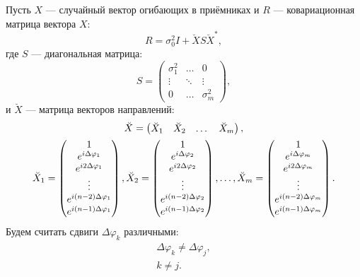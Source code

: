 Пусть $X$ --- случайный вектор огибающих в приёмниках и $R$ --- ковариационная матрица вектора $X$:
\[
    R = \sigma_0^2 I + \breve{X} S \breve{X}^* ,
\]
где $S$ --- диагональная матрица:
\[
    S
    = \begin{pmatrix}
        \sigma_1^2 & \dots  & 0          \\
        \vdots     & \ddots & \vdots     \\
        0          & \dots  & \sigma_m^2
    \end{pmatrix} ,
\]
и $\breve{X}$ --- матрица векторов направлений:
\begin{gather*}
    \breve{X}
    = \begin{pmatrix}
        \breve{X}_1 & \breve{X}_2 & \dots & \breve{X}_m
    \end{pmatrix} ,
    \notag \\
    \breve{X}_1
    = \begin{pmatrix}
        1                            \\
        e^{i \Delta \varphi_1}       \\
        e^{i 2 \Delta \varphi_1}     \\
        \vdots                       \\
        e^{i (n-2) \Delta \varphi_1} \\
        e^{i (n-1) \Delta \varphi_1}
    \end{pmatrix}
    ,
    \breve{X}_2
    = \begin{pmatrix}
        1                            \\
        e^{i \Delta \varphi_2}       \\
        e^{i 2 \Delta \varphi_2}     \\
        \vdots                       \\
        e^{i (n-2) \Delta \varphi_2} \\
        e^{i (n-1) \Delta \varphi_2}
    \end{pmatrix}
    ,
    \dots
    ,
    \breve{X}_m
    = \begin{pmatrix}
        1                            \\
        e^{i \Delta \varphi_m}       \\
        e^{i 2 \Delta \varphi_m}     \\
        \vdots                       \\
        e^{i (n-2) \Delta \varphi_m} \\
        e^{i (n-1) \Delta \varphi_m}
    \end{pmatrix}
    .
\end{gather*}
Будем считать сдвиги $\Delta \varphi_k$ различными:
\begin{gather*}
    \Delta \varphi_k \neq \Delta \varphi_j , \\
    k \neq j .
\end{gather*}

